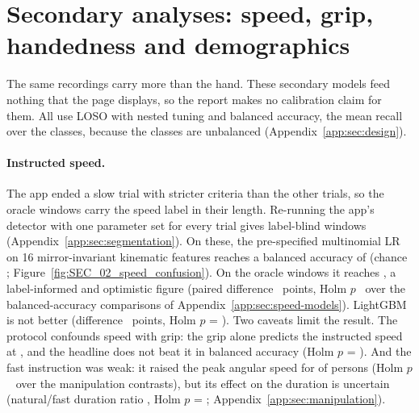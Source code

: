 \section{Secondary analyses: speed, grip, handedness and demographics}\label{sec:secondary}

The same recordings carry more than the hand. These secondary models feed nothing that the page displays, so the
report makes no calibration claim for them. All use LOSO with nested tuning and balanced accuracy, the mean recall
over the classes, because the classes are unbalanced (Appendix~\ref{app:sec:design}).

\paragraph{Instructed speed.} The app ended a slow trial with stricter criteria than the other trials, so the
oracle windows carry the speed label in their length. Re-running the app's detector with one parameter set for
every trial gives label-blind windows (Appendix~\ref{app:sec:segmentation}). On these, the pre-specified
multinomial LR on 16 mirror-invariant kinematic features reaches a balanced accuracy of
 (chance ; Figure~\ref{fig:SEC_02_speed_confusion}). On the
oracle windows it reaches , a label-informed and optimistic figure (paired difference
~points, Holm $p$~ over the balanced-accuracy
comparisons of Appendix~\ref{app:sec:speed-models}). LightGBM is not better (difference
~points, Holm $p$ =
). Two caveats limit the result. The protocol
confounds speed with grip: the grip alone predicts the instructed speed at , and the
headline does not beat it in balanced accuracy (Holm $p$ =
). And the fast instruction was weak: it raised the peak
angular speed for  of
 persons (Holm $p$~ over the manipulation contrasts), but its effect on the duration is uncertain
(natural/fast duration ratio , Holm $p$ =
; Appendix~\ref{app:sec:manipulation}).

